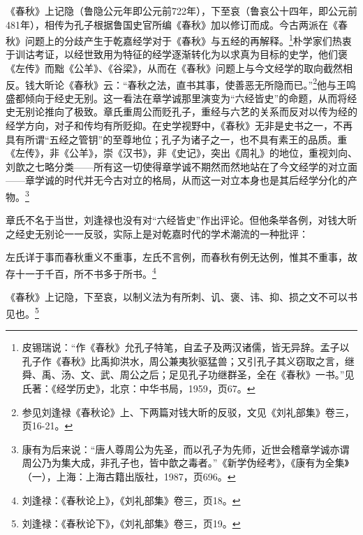 \documentclass[a4paper, 12pt, openright]{ctexbook}
\renewenvironment{quote}
  {\list{}{\rightmargin2\ccwd \leftmargin2\ccwd \itemindent=2\ccwd \listparindent=2\ccwd}%
   \item\relax\small\kaishu\color{black}}
  {\endlist}
\begin{document}
《春秋》上记隐（鲁隐公元年即公元前722年），下至哀（鲁哀公十四年，即公元前481年），相传为孔子根据鲁国史官所编《春秋》加以修订而成。今古两派在《春秋》问题上的分歧产生于乾嘉经学对于《春秋》与五经的再解释。\footnote{皮锡瑞说：“作《春秋》允孔子特笔，自孟子及两汉诸儒，皆无异辞。孟子以孔子作《春秋》比禹抑洪水，周公兼夷狄驱猛兽；又引孔子其义窃取之言，继舜、禹、汤、文、武、周公之后；足见孔子功继群圣，全在《春秋》一书。”见氏著：《经学历史》，北京：中华书局，1959，页67。}朴学家们热衷于训诂考证，以经世致用为特征的经学逐渐转化为以求真为目标的史学，他们褒《左传》而黜《公羊》、《谷梁》，从而在《春秋》问题上与今文经学的取向截然相反。钱大昕论《春秋》云：“春秋之法，直书其事，使善恶无所隐而已。”\footnote{参见刘逢禄《春秋论》上、下两篇对钱大昕的反驳，文见《刘礼部集》卷三，页16-21。}他与王鸣盛都倾向于经史无别。这一看法在章学诚那里演变为“六经皆史”的命题，从而将经史无别论推向了极致。章氏重周公而贬孔子，重经与六艺的关系而反对以传为经的经学方向，对子和传均有所贬抑。在史学视野中，《春秋》无非是史书之一，不再具有所谓“五经之管钥”的至尊地位；孔子为诸子之一，也不具有素王的品质。重《左传》，非《公羊》，崇《汉书》，非《史记》，突出《周礼》的地位，重视刘向、刘歆之七略分类——所有这一切使得章学诚不期然而然地站在了今文经学的对立面——章学诚的时代并无今古对立的格局，从而这一对立本身也是其后经学分化的产物。\footnote{康有为后来说：“唐人尊周公为先圣，而以孔子为先师，近世会稽章学诚亦谓周公乃为集大成，非孔子也，皆中歆之毒者。”《新学伪经考》，《康有为全集》（一），上海：上海古籍出版社，1987，页696。}

章氏不名于当世，刘逢禄也没有对“六经皆史”作出评论。但他条举各例，对钱大昕之经史无别论一一反驳，实际上是对乾嘉时代的学术潮流的一种批评：

\begin{quote}
左氏详于事而春秋重义不重事，左氏不言例，而春秋有例无达例，惟其不重事，故存十一于千百，所不书多于所书。\footnote{刘逢禄：《春秋论上》，《刘礼部集》卷三，页18。}
\end{quote}
\begin{quote}
《春秋》上记隐，下至哀，以制义法为有所刺、讥、褒、讳、抑、损之文不可以书见也。\footnote{刘逢禄：《春秋论下》，《刘礼部集》卷三，页19。}
\end{quote}
\end{document}

